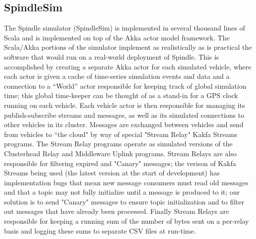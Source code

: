 \documentclass{thesis}
\begin{document}
\subsection{SpindleSim}
    The Spindle simulator (SpindleSim) is implemented in several thousand lines of Scala \cite{scala} 
    and is implemented on top of the Akka
    actor model framework. The Scala/Akka portions of the simulator implement as realistically
    as is practical the software that would run on a real-world deployment of Spindle. This is
    accomplished by creating a separate Akka actor for each simulated vehicle, where each actor
    is given a cache of time-series simulation events and data and a connection to a ``World''
    actor responsible for keeping track of global simulation time; this global time-keeper 
    can be thought of as a stand-in for a GPS clock running on each vehicle. Each vehicle
    actor is then responsible for managing its publish-subscribe streams and messages, as well
    as its simulated connections to other vehicles in its cluster. Messages are exchanged between
    vehicles and send from vehicles to ``the cloud" by way of special "Stream Relay" Kakfa Streams
    programs. The Stream Relay programs operate as simulated versions of the Clusterhead Relay
    and Middleware Uplink programs. Stream Relays are also responsible for filtering 
    expired and "Canary" messages; the verison of Kakfa Streams being used (the latest version
    at the start of development) has implementation bugs that mean new message consumers must
    read old messages and that a topic may not fully initialize until a message is produced to it;
    our solution is to send "Canary" messages to ensure topic initialization and to filter out messages
    that have already been processed. Finally Stream Relays are responsible for keeping a 
    running sum of the number of bytes sent on a per-relay basis and logging these sums to separate 
    CSV files at run-time.
\end{document}
